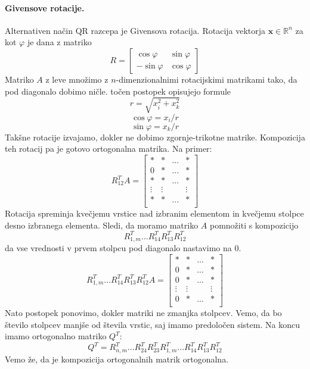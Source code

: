 \documentclass[a4paper]{article}
\newcommand{\R}{\mathbb{R}}
\begin{document}
\paragraph{Givensove rotacije.} Alternativen način QR razcepa je Givensova rotacija. Rotacija vektorja \(\mathbf{x} \in \R^n\) za kot \(\varphi\) je dana z matriko
\[R = \begin{bmatrix}
    \cos\varphi & \sin\varphi \\ -\sin\varphi & \cos\varphi
\end{bmatrix}\]
Matriko \(A\) z leve množimo z \(n\)-dimenzionalnimi rotacijskimi matrikami tako, da pod diagonalo dobimo ničle.
točen postopek opisujejo formule
\[r = \sqrt{x_i^2 + x_k^2}\]
\[\cos\varphi = x_i/r\]
\[\sin\varphi = x_k/r\]
Takšne rotacije izvajamo, dokler ne dobimo zgornje-trikotne matrike. Kompozicija teh rotacij pa je gotovo ortogonalna matrika.
Na primer:
\[R_{12}^TA = \begin{bmatrix}
    * & * & ... & * \\
    0 & * & ... & * \\
    * & * & ... & * \\
    \vdots & \vdots && \vdots \\
    * & * & ... & * \\
\end{bmatrix}\]
Rotacija spreminja kvečjemu vrstice nad izbranim elementom in kvečjemu stolpce desno izbranega elementa.
Sledi, da moramo matriko \(A\) pomnožiti s kompozicijo
\[R_{1,m}^T...R_{14}^TR_{13}^TR_{12}^T\]
da vse vrednosti v prvem stolpcu pod diagonalo nastavimo na 0.
\[R_{1,m}^T...R_{14}^TR_{13}^TR_{12}^T A = \begin{bmatrix}
    * & * & ... & * \\
    0 & * & ... & * \\
    0 & * & ... & * \\
    \vdots & \vdots & & \vdots \\
    0 & * & ... & * \\
\end{bmatrix}\]
Nato postopek ponovimo, dokler matriki ne zmanjka stolpcev. Vemo, da bo število stolpcev manjše od števila vrstic, saj imamo predoločen sistem.
Na koncu imamo ortogonalno matriko \(Q^T\):
\[Q^T = R_{n,m}^T...R_{24}^TR_{23}^T R_{1,m}^T...R_{14}^TR_{13}^TR_{12}^T\]
Vemo že, da je kompozicija ortogonalnih matrik ortogonalna.
\end{document}
